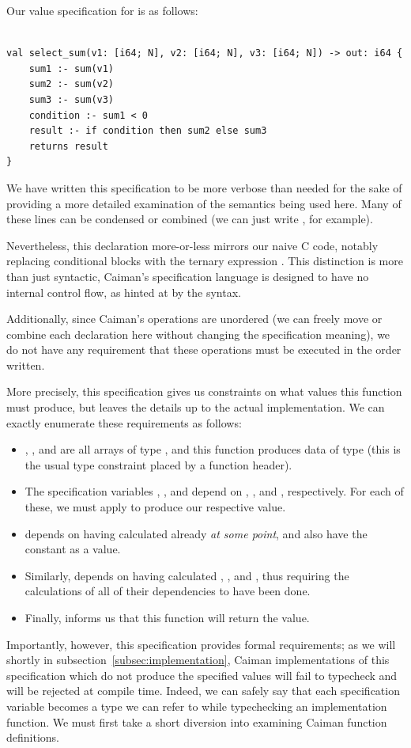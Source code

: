 Our value specification for  is as follows:
%
\begin{lstlisting}

val select_sum(v1: [i64; N], v2: [i64; N], v3: [i64; N]) -> out: i64 {
    sum1 :- sum(v1)
    sum2 :- sum(v2)
    sum3 :- sum(v3)
    condition :- sum1 < 0
    result :- if condition then sum2 else sum3
    returns result
}
\end{lstlisting}
%
We have written this specification to be more verbose than needed for the sake of providing a more detailed examination of the semantics being used here.  Many of these lines can be condensed or combined (we can just write , for example).

Nevertheless, this declaration more-or-less mirrors our naive C code, notably replacing conditional  blocks with the ternary expression .  This distinction is more than just syntactic, Caiman's specification language is designed to have no internal control flow, as hinted at by the syntax.

Additionally, since Caiman's operations are unordered (we can freely move or combine each declaration here without changing the specification meaning), we do not have any requirement that these operations must be executed in the order written.

More precisely, this specification gives us constraints on what values this function must produce, but leaves the details up to the actual implementation.  We can exactly enumerate these requirements as follows:
%
\begin{itemize}
\item {}, , and  are all arrays of type , and this function produces data of type  (this is the usual type constraint placed by a function header).
\item The specification variables , , and  depend on , , and , respectively.  For each of these, we must apply  to produce our respective value.
\item {} depends on having calculated  already \textit{at some point}, and also have the constant  as a value.
\item Similarly,  depends on having calculated , , and , thus requiring the calculations of all of their dependencies to have been done.
\item Finally,  informs us that this function will return the  value.
\end{itemize}
%
Importantly, however, this specification provides formal requirements; as we will shortly in subsection~\ref{subsec:implementation}, Caiman implementations of this specification which do not produce the specified values will fail to typecheck and will be rejected at compile time.  Indeed, we can safely say that each specification variable becomes a type we can refer to while typechecking an implementation function.  We must first take a short diversion into examining Caiman function definitions.

